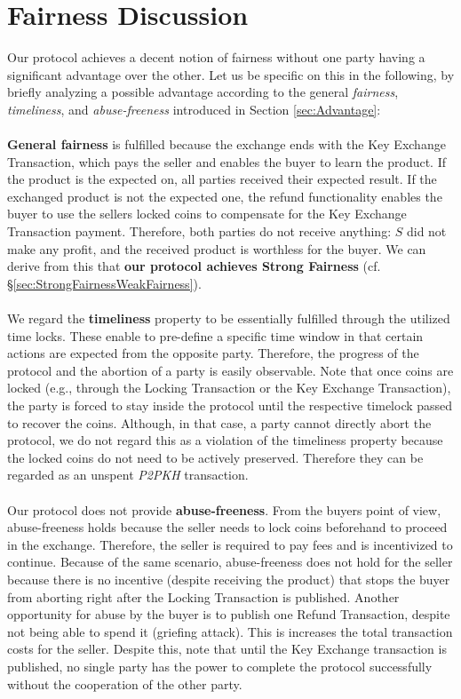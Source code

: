 \documentclass{cacthesis}
\newcounter{protocol}
\begin{document}
        
        \section{Fairness Discussion}
        \label{sec:FairnessDiscussion}
	    Our protocol achieves a decent notion of fairness without one party having a significant advantage over the other. Let us be specific on this in the following, by briefly analyzing a possible advantage according to the general \textit{fairness}, \textit{timeliness}, and \textit{abuse-freeness} introduced in Section \ref{sec:Advantage}: \\\\
        \textbf{General fairness} is fulfilled because the exchange ends with the Key Exchange Transaction, which pays the seller and enables the buyer to learn the product. If the product is the expected on, all parties received their expected result. If the exchanged product is not the expected one, the refund functionality enables the buyer to use the sellers locked coins to compensate for the Key Exchange Transaction payment. Therefore, both parties do not receive anything: $S$ did not make any profit, and the received product is worthless for the buyer. We can derive from this that \textbf{our protocol achieves Strong Fairness} (cf. §\ref{sec:StrongFairnessWeakFairness}). \\\\
        We regard the \textbf{timeliness} property to be essentially fulfilled through the utilized time locks. These enable to pre-define a specific time window in that certain actions are expected from the opposite party. Therefore, the progress of the protocol and the abortion of a party is easily observable. Note that once coins are locked (e.g., through the Locking Transaction or the Key Exchange Transaction), the party is forced to stay inside the protocol until the respective timelock passed to recover the coins. Although, in that case, a party cannot directly abort the protocol, we do not regard this as a violation of the timeliness property because the locked coins do not need to be actively preserved. Therefore they can be regarded as an unspent \textit{P2PKH} transaction. \\\\
        Our protocol does not provide \textbf{abuse-freeness}. From the buyers point of view, abuse-freeness holds because the seller needs to lock coins beforehand to proceed in the exchange. Therefore, the seller is required to pay fees and is incentivized to continue. Because of the same scenario, abuse-freeness does not hold for the seller because there is no incentive (despite receiving the product) that stops the buyer from aborting right after the Locking Transaction is published. Another opportunity for abuse by the buyer is to publish one Refund Transaction, despite not being able to spend it (griefing attack). This is increases the total transaction costs for the seller. Despite this, note that until the Key Exchange transaction is published, no single party has the power to complete the protocol successfully without the cooperation of the other party. \\\\
\end{document}
